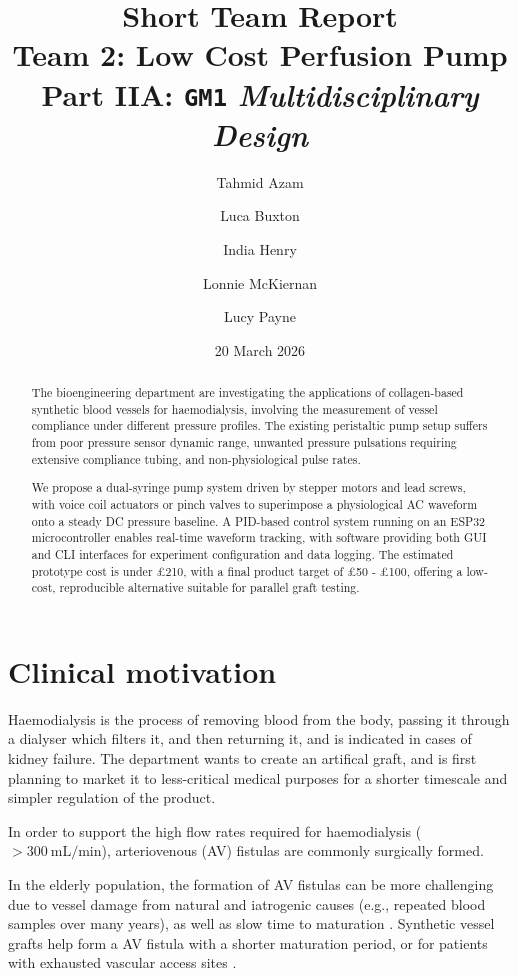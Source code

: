 \documentclass[10pt, a4paper]{article}
\title{
    Short Team Report\\[0.5em] 
    \Large Team 2: Low Cost Perfusion Pump\\[0.25em]  
    \normalsize Part IIA: \texttt{GM1} \textit{Multidisciplinary Design}
}
\author[1]{Tahmid Azam}
\author[1]{Luca Buxton}
\author[1]{India Henry}
\author[1]{Lonnie McKiernan}
\author[1]{Lucy Payne}
\affil[ ]{{\normalsize Mentored by Dr. Peter Long and Prof. Athina E. Markaki}}
\affil[ ]{{\small}}
\affil[1]{Department of Engineering, University of Cambridge}
\date{20 March 2026}
\begin{document}
\maketitle

\begin{abstract}
    The bioengineering department are investigating the applications of collagen-based synthetic blood vessels for haemodialysis, involving the measurement of vessel compliance under different pressure profiles. The existing peristaltic pump setup suffers from poor pressure sensor dynamic range, unwanted pressure pulsations requiring extensive compliance tubing, and non-physiological pulse rates.
    
    We propose a dual-syringe pump system driven by stepper motors and lead screws, with voice coil actuators or pinch valves to superimpose a physiological AC waveform onto a steady DC pressure baseline. A PID-based control system running on an ESP32 microcontroller enables real-time waveform tracking, with software providing both GUI and CLI interfaces for experiment configuration and data logging. The estimated prototype cost is under £210, with a final product target of £50 - £100, offering a low-cost, reproducible alternative suitable for parallel graft testing.
\end{abstract}

\newpage
{}

\section{Clinical motivation}

Haemodialysis is the process of removing blood from the body, passing it through a dialyser which filters it, and then returning it, and is indicated in cases of kidney failure.
The department wants to create an artifical graft, and is first planning to market it to less-critical medical purposes for a shorter timescale and simpler regulation of the product.

In order to support the high flow rates required for haemodialysis ($>\SI{300}{\milli\liter\per\minute}$), arteriovenous (AV) fistulas are commonly surgically formed.

In the elderly population, the formation of AV fistulas can be more challenging due to vessel damage from natural and iatrogenic causes (e.g., repeated blood samples over many years), as well as slow time to maturation \supercite{mcgroganArteriovenousFistulaOutcomes2015}.
Synthetic vessel grafts help form a AV fistula with a shorter maturation period, or for patients with exhausted vascular access sites \supercite{akohProstheticArteriovenousGrafts2009}.
\end{document}
